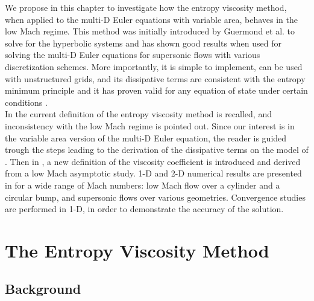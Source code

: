 We propose in this chapter to investigate how the entropy viscosity method, when applied to the multi-D Euler equations with variable area, behaves in the low Mach regime. This method was initially introduced by Guermond et al. to solve for the hyperbolic systems and has shown good results when used for solving the multi-D Euler equations for supersonic flows with various discretization schemes. More importantly, it is simple to implement, can be used with unstructured grids,  and its dissipative terms are consistent with the entropy minimum principle and it has proven valid for any equation of state under certain conditions \cite{jlg}. \\

In  the current definition of the entropy viscosity method is recalled, and inconsistency with the low Mach regime is pointed out. Since our interest is in the variable area version of the multi-D Euler equation, the reader is guided trough the steps leading to the derivation of the dissipative terms on the model of \cite{jlg}. Then in , a new definition of the viscosity coefficient is introduced and derived from a low Mach asymptotic study. 1-D and 2-D numerical results are presented in  for a wide range of Mach numbers: low Mach flow over a cylinder and a circular bump, and supersonic flows over various geometries. Convergence studies are performed in 1-D, in order to demonstrate the accuracy of the solution.

\section{The Entropy Viscosity Method} \label{sec:entro_visc}

\subsection{Background} \label{sec:background}

